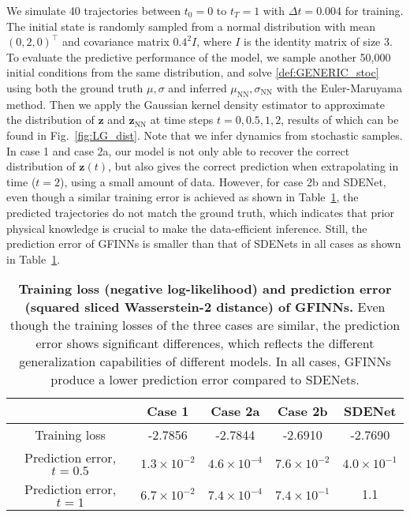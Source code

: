 \documentclass[openacc]{rsproca_new}%
\newcommand{\z}{\bm{z}}
\begin{document}
We simulate 40 trajectories between $t_0 = 0$ to $t_T = 1$ with $\Delta t = 0.004$ for training. 
The initial state is 
randomly sampled from 
a normal distribution with 
mean $(0, 2, 0)^\top$
and covariance matrix $0.4^2I$,
where $I$ is the identity matrix of size $3$.
To evaluate the predictive performance of the model, we sample another 50,000 initial conditions from the same distribution, and solve \eqref{def:GENERIC_stoc} using both the ground truth $\mu, \sigma$ and inferred $\mu_{\text{NN}},\sigma_{\text{NN}}$ with the Euler-Maruyama method. Then we apply the Gaussian kernel density estimator 
    \cite{parzen1962estimation}
    to approximate the distribution of $\z$ and $\z_{\text{NN}}$ at time steps $t = 0, 0.5, 1, 2$, results of which can be found in Fig.~\ref{fig:LG_dist}. 
    Note that we infer dynamics from stochastic samples.
    In case 1 and case 2a, our model is not only able to recover the correct distribution of $\z(t)$, but also gives the correct prediction when extrapolating in time ($t = 2$), using a small amount of data. However, for case 2b and SDENet, even though a similar training error is achieved as shown in Table~\ref{tab:LG_loss}, the predicted trajectories do not match the ground truth, which indicates that prior physical knowledge is crucial to make the data-efficient inference. Still, the prediction error of GFINNs is smaller than that of SDENets in all cases
    as shown in Table~\ref{tab:LG_loss}.

\begin{table}[htbp]
\centering
\begin{tabular}{|c|c|c|c|c|}
\hline
 & Case 1 & Case 2a & Case 2b & SDENet \\ \hline
 Training loss & -2.7856 & -2.7844 & -2.6910 & -2.7690 \\ \hline
  Prediction error, $t = 0.5$ & $1.3\times 10^{-2}$ & $4.6\times 10^{-4}$ & $7.6\times 10^{-2}$ & $4.0\times 10^{-1}$ \\ \hline
 Prediction error, $t = 1$ & $6.7\times 10^{-2}$ & $7.4\times 10^{-4}$ & $7.4\times 10^{-1}$ & 1.1 \\ \hline
\end{tabular}
\caption{\textbf{Training loss (negative log-likelihood) and prediction error (squared sliced Wasserstein-2 distance) of GFINNs.} Even though the training losses of the three cases are similar, the prediction error shows significant differences, which reflects the different generalization capabilities of different models. In all cases, GFINNs produce a lower prediction error compared to SDENets.}
\label{tab:LG_loss}
\end{table}
\end{document}
